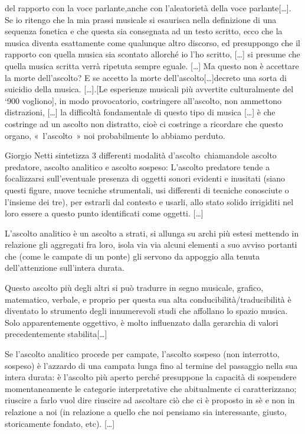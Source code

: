 del rapporto con la voce parlante,anche con l’aleatorietà della voce parlante[…].
Se io ritengo che la mia prassi musicale  si esaurisca nella definizione di una
sequenza fonetica e che questa sia consegnata ad un testo scritto, ecco che la
musica diventa esattamente come qualunque altro discorso, ed presuppongo che il
rapporto con quella musica sia scontato allorché io l’ho scritto, […] si presume
che quella musica scritta verrà ripetuta sempre eguale. […] Ma questo non è
accettare la morte dell’ascolto? E se accetto la morte dell’ascolto[…]decreto
una sorta di suicidio della musica. […].[Le esperienze musicali più avvertite
culturalmente  del ‘900 vogliono], in modo provocatorio, costringere all’ascolto,
non ammettono distrazioni, […] la difficoltà fondamentale di questo tipo di
musica […] è che costringe ad un ascolto non distratto, cioè ci costringe a
ricordare che questo organo, « l’ascolto » noi probabilmente lo abbiamo perduto.

Giorgio Netti sintetizza 3 differenti modalità d’ascolto chiamandole ascolto
predatore, ascolto analitico e ascolto sospeso: L’ascolto predatore tende a
focalizzarsi sull’eventuale presenza di oggetti sonori evidenti e inusitati
(siano questi figure, nuove tecniche strumentali, usi differenti di tecniche
conosciute o l’insieme dei tre), per estrarli dal contesto e usarli, allo stato
solido irrigiditi nel loro essere a questo punto identificati come oggetti. […]

L’ascolto analitico è un ascolto a strati, si allunga su archi più estesi
mettendo in relazione gli aggregati fra loro, isola via via alcuni elementi a
suo avviso portanti che (come le campate di un ponte) gli servono da appoggio
alla tenuta dell’attenzione sull’intera durata.

Questo ascolto più degli altri si può tradurre in segno musicale, grafico,
matematico, verbale, e proprio per questa sua alta conducibilità/traducibilità
è diventato lo strumento degli innumerevoli studi che affollano lo spazio
musica. Solo apparentemente oggettivo, è molto influenzato dalla gerarchia di
valori precedentemente stabilita[…]

Se l’ascolto analitico procede per campate, l’ascolto sospeso (non interrotto,
sospeso) è l’azzardo di una campata lunga fino al termine del passaggio nella
sua intera durata: è l’ascolto più aperto perché presuppone la capacità di
sospendere momentaneamente le categorie interpretative che abitualmente ci
caratterizzano; riuscire a farlo vuol dire riuscire ad ascoltare ciò che ci è
proposto in sè e non in relazione a noi (in relazione a quello che noi pensiamo
sia interessante, giusto, storicamente fondato, etc). […]

